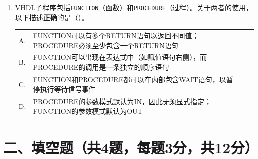 \begin{enumerate}[label=\arabic*.]
\vspace{0.8cm}

\item VHDL子程序包括\texttt{FUNCTION}（函数）和\texttt{PROCEDURE}（过程）。关于两者的使用，以下描述\textbf{正确}的是（\quad）。

\vspace{0.3cm}

\begin{tabular}{@{}lp{}@{\qquad}lp{}@{}}
A. & FUNCTION可以有多个RETURN语句以返回不同值；PROCEDURE必须至少包含一个RETURN语句 \\
B. & FUNCTION可以出现在表达式中（如赋值语句右侧），而PROCEDURE的调用是一条独立的顺序语句 \\
C. & FUNCTION和PROCEDURE都可以在内部包含WAIT语句，以暂停执行等待信号事件 \\
D. & PROCEDURE的参数模式默认为IN，因此无须显式指定；FUNCTION的参数模式默认为OUT \\
\end{tabular}

\end{enumerate}

\newpage

\section*{二、填空题（共4题，每题3分，共12分）}

